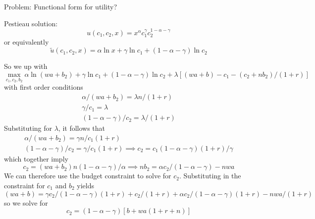 \documentclass{article}
\begin{document}
Problem: Functional form for utility?

Pestieau solution:
\begin{equation}
u(c_{1}, c_{2}, x) = x^{\alpha} c_{1}^{\gamma} c_{2}^{1-\alpha-\gamma}
\end{equation}
or equivalently
\begin{equation}
\tilde{u}(c_{1}, c_{2}, x) = \alpha \ln x +\gamma \ln c_{1} + (1-\alpha-\gamma) \ln c_{2}
\end{equation}


So we up with
\begin{equation}
\max_{c_{1}, c_{2}, b_{2}}
\alpha \ln (wa+ b_{2}) 
+ \gamma \ln c_{1}
+ (1-\alpha-\gamma) \ln c_{2}
+ \lambda [ (w a + b) - c_{1} - (c_{2} + n b_{2})/(1+r)]
\end{equation}
with first order conditions
\begin{gather}
\alpha/(wa+b_{2}) = \lambda n/(1+r)
\\
\gamma/c_{1} = \lambda
\\
(1-\alpha-\gamma)/ c_{2} = \lambda / (1+r)
\end{gather}
Substituting for $\lambda$, it follows that
\begin{gather}
\alpha/(wa+b_{2}) = \gamma n/ c_{1} (1+r)
\\
(1-\alpha-\gamma)/ c_{2} = \gamma / c_{1} (1+r)  \implies  c_{2} = c_{1} (1-\alpha-\gamma)(1+r)/\gamma 
\end{gather}
which together imply
\begin{equation}
c_{2} = (wa+b_{2})n(1-\alpha-\gamma)/\alpha \implies n b_{2} = \alpha c_{2} /(1-\alpha-\gamma)  - nwa
\end{equation}
We can therefore use the budget constraint to solve for $c_{2}$.
Substituting in the constraint for $c_{1}$ and $b_{2}$ yields
\begin{equation}
(w a + b) = \gamma c_{2}/(1-\alpha-\gamma)(1+r) + c_{2}/(1+r) + \alpha c_{2}/(1-\alpha-\gamma)(1+r) - nwa/(1+r) 
\end{equation}
so we solve for
\begin{equation}
c_{2} = (1-\alpha-\gamma)[b + wa(1+r+n)]
\end{equation}
\end{document}
